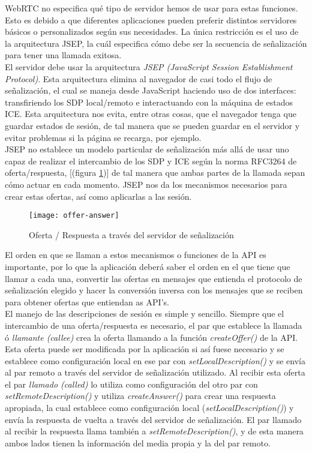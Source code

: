 WebRTC no especifica qué tipo de servidor hemos de usar para estas funciones. Esto es debido a que diferentes aplicaciones pueden preferir distintos servidores básicos o personalizados según sus necesidades. La única restricción es el uso de la arquitectura JSEP, la cuál especifica cómo debe ser la secuencia de señalización para tener una llamada exitosa.\\


El servidor debe usar la arquitectura \emph{JSEP (JavaScript Session Establishment Protocol)}. Esta arquitectura elimina al navegador de casi todo el flujo de señalización, el cual se maneja desde JavaScript haciendo uso de dos interfaces: transfiriendo los SDP local/remoto e interactuando con la máquina de estados ICE. Esta arquitectura nos evita, entre otras cosas, que el navegador tenga que guardar estados de sesión, de tal manera que se pueden guardar en el servidor y evitar problemas si la página se recarga, por ejemplo. \\

JSEP no establece un modelo particular de señalización más allá de usar uno capaz de realizar el intercambio de los SDP y ICE según la norma RFC3264 de oferta/respuesta, [(figura \ref{fig:oferta-respuesta})] de tal manera que ambas partes de la llamada sepan cómo actuar en cada momento. JSEP nos da los mecanismos necesarios para crear estas ofertas, así como aplicarlas a las sesión.\\

\begin{figure}[htb]
\centering
\texttt{[image: offer-answer]}
\caption{Oferta / Respuesta a través del servidor de señalización}
\label{fig:oferta-respuesta}
\end{figure}


El orden en que se llaman a estos mecanismos o funciones de la API es importante, por lo que la aplicación deberá saber el orden en el que tiene que llamar a cada una, convertir las ofertas en mensajes que entienda el protocolo de señalización elegido y hacer la conversión inversa con los mensajes que se reciben para obtener ofertas que entiendan as API's.\\

El manejo de las descripciones de sesión es simple y sencillo. Siempre que el intercambio de una oferta/respuesta es necesario, el par que establece la llamada ó \textit{llamante (callee)} crea la oferta llamando a la función \emph{createOffer()} de la API. Esta oferta puede ser modificada por la aplicación si así fuese necesario y se establece como configuración local en ese par con \emph{setLocalDescription()} y se envía al par remoto a través del servidor de señalización utilizado. Al recibir esta oferta el par \textit{llamado (called)} lo utiliza como configuración del otro par con \emph{setRemoteDescription()} y utiliza \emph{createAnswer()} para crear una respuesta apropiada, la cual establece como configuración local (\emph{setLocalDescription()}) y envía la respuesta de vuelta a través del servidor de señalización. El par llamado al recibir la respuesta llama también a \emph{setRemoteDescription()}, y de esta manera ambos lados tienen la información del media propia y la del par remoto.\\ 


